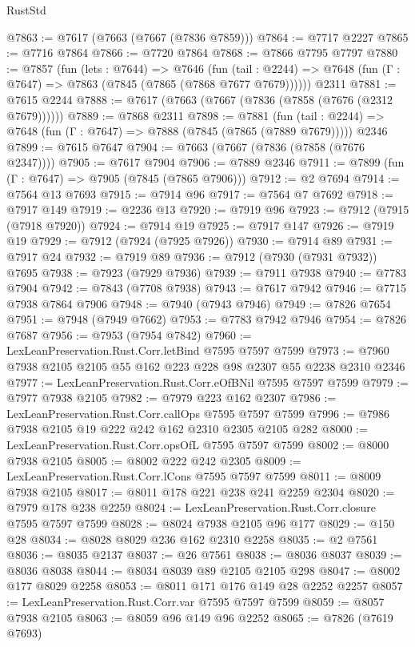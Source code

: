 \begin{lexlean}{RustStd}
\begin{coremodule}
@7863 := @7617 (@7663 (@7667 (@7836 @7859)))
@7864 := @7717 @2227
@7865 := @7716 @7864
@7866 := @7720 @7864
@7868 := @7866 @7795 @7797
@7880 := @7857
    (fun (lets : @7644) =>
    @7646
      (fun (tail : @2244) => @7648 (fun (Γ : @7647) => @7863 (@7845 (@7865 (@7868 @7677 @7679))))))
    @2311
@7881 := @7615 @2244
@7888 := @7617 (@7663 (@7667 (@7836 (@7858 (@7676 (@2312 @7679))))))
@7889 := @7868 @2311
@7898 := @7881
    (fun (tail : @2244) => @7648 (fun (Γ : @7647) => @7888 (@7845 (@7865 (@7889 @7679)))))
    @2346
@7899 := @7615 @7647
@7904 := @7663 (@7667 (@7836 (@7858 (@7676 @2347))))
@7905 := @7617 @7904
@7906 := @7889 @2346
@7911 := @7899 (fun (Γ : @7647) => @7905 (@7845 (@7865 @7906)))
@7912 := @2 @7694
@7914 := @7564 @13 @7693
@7915 := @7914 @96
@7917 := @7564 @7 @7692
@7918 := @7917 @149
@7919 := @2236 @13
@7920 := @7919 @96
@7923 := @7912 (@7915 (@7918 @7920))
@7924 := @7914 @19
@7925 := @7917 @147
@7926 := @7919 @19
@7929 := @7912 (@7924 (@7925 @7926))
@7930 := @7914 @89
@7931 := @7917 @24
@7932 := @7919 @89
@7936 := @7912 (@7930 (@7931 @7932)) @7695
@7938 := @7923 (@7929 @7936)
@7939 := @7911 @7938
@7940 := @7783 @7904
@7942 := @7843 (@7708 @7938)
@7943 := @7617 @7942
@7946 := @7715 @7938 @7864 @7906
@7948 := @7940 (@7943 @7946)
@7949 := @7826 @7654
@7951 := @7948 (@7949 @7662)
@7953 := @7783 @7942 @7946
@7954 := @7826 @7687
@7956 := @7953 (@7954 @7842)
@7960 := LexLeanPreservation.Rust.Corr.letBind @7595 @7597 @7599
@7973 := @7960 @7938 @2105 @2105 @55 @162 @223 @228 @98 @2307 @55 @2238 @2310 @2346
@7977 := LexLeanPreservation.Rust.Corr.eOfBNil @7595 @7597 @7599
@7979 := @7977 @7938 @2105
@7982 := @7979 @223 @162 @2307
@7986 := LexLeanPreservation.Rust.Corr.callOps @7595 @7597 @7599
@7996 := @7986 @7938 @2105 @19 @222 @242 @162 @2310 @2305 @2105 @282
@8000 := LexLeanPreservation.Rust.Corr.opsOfL @7595 @7597 @7599
@8002 := @8000 @7938 @2105
@8005 := @8002 @222 @242 @2305
@8009 := LexLeanPreservation.Rust.Corr.lCons @7595 @7597 @7599
@8011 := @8009 @7938 @2105
@8017 := @8011 @178 @221 @238 @241 @2259 @2304
@8020 := @7979 @178 @238 @2259
@8024 := LexLeanPreservation.Rust.Corr.closure @7595 @7597 @7599
@8028 := @8024 @7938 @2105 @96 @177
@8029 := @150 @28
@8034 := @8028 @8029 @236 @162 @2310 @2258
@8035 := @2 @7561
@8036 := @8035 @2137
@8037 := @26 @7561
@8038 := @8036 @8037
@8039 := @8036 @8038
@8044 := @8034 @8039 @89 @2105 @2105 @298
@8047 := @8002 @177 @8029 @2258
@8053 := @8011 @171 @176 @149 @28 @2252 @2257
@8057 := LexLeanPreservation.Rust.Corr.var @7595 @7597 @7599
@8059 := @8057 @7938 @2105
@8063 := @8059 @96 @149 @96 @2252
@8065 := @7826 (@7619 @7693)

\end{coremodule}
\end{lexlean}
